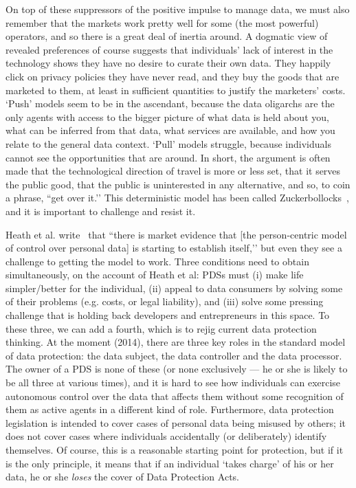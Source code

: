 \documentclass[graybox]{svmult}
\begin{document}
On top of these suppressors of the positive impulse to manage data, we must also remember that the markets work pretty well for some (the most powerful) operators, and so there is a great deal of inertia around. A dogmatic view of revealed preferences of course suggests that individuals’ lack of interest in the technology shows they have no desire to curate their own data. They happily click on privacy policies they have never read, and they buy the goods that are marketed to them, at least in sufficient quantities to justify the marketers’ costs. `Push’ models seem to be in the ascendant, because the data oligarchs are the only agents with access to the bigger picture of what data is held about you, what can be inferred from that data, what services are available, and how you relate to the general data context. `Pull’ models struggle, because individuals cannot see the opportunities that are around. In short, the argument is often made that the technological direction of travel is more or less set, that it serves the public good, that the public is uninterested in any alternative, and so, to coin a phrase, ``get over it.’’ This deterministic model has been called Zuckerbollocks~\cite{ohara2013}, and it is important to challenge and resist it.


Heath et al. write~\cite{heath2013} that ``there is market evidence that [the person-centric model of control over personal data] is starting to establish itself,’’ but even they see a challenge to getting the model to work. Three conditions need to obtain simultaneously, on the account of Heath et al: PDSs must (i) make life simpler/better for the individual, (ii) appeal to data consumers by solving some of their problems (e.g. costs, or legal liability), and (iii) solve some pressing challenge that is holding back developers and entrepreneurs in this space. To these three, we can add a fourth, which is to rejig current data protection thinking. At the moment (2014), there are three key roles in the standard model of data protection: the data subject, the data controller and the data processor. The owner of a PDS is none of these (or none exclusively --- he or she is likely to be all three at various times), and it is hard to see how individuals can exercise autonomous control over the data that affects them without some recognition of them as active agents in a different kind of role. Furthermore, data protection legislation is intended to cover cases of personal data being misused by others; it does not cover cases where individuals accidentally (or deliberately) identify themselves. Of course, this is a reasonable starting point for protection, but if it is the only principle, it means that if an individual `takes charge’ of his or her data, he or she {\em loses} the cover of Data Protection Acts.
\end{document}

